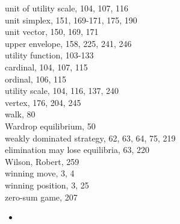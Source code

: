 \documentclass[12pt]{article}
\begin{document}
unit of utility scale, 104, 107, 116\\
unit simplex, 151, 169-171, 175, 190\\
unit vector, 150, 169, 171\\
upper envelope, 158, 225, 241, 246\\
utility function, 103-133\\
cardinal, 104, 107, 115\\
ordinal, 106, 115\\
utility scale, 104, 116, 137, 240\\
vertex, 176, 204, 245\\
walk, 80\\
Wardrop equilibrium, 50\\
weakly dominated strategy, 62, 63, 64, 75, 219\\
elimination may lose equilibria, 63, 220\\
Wilson, Robert, 259\\
winning move, 3, 4\\
winning position, 3, 25\\
zero-sum game, 207

\begin{itemize}
  \item 
\end{itemize}
\end{document}
